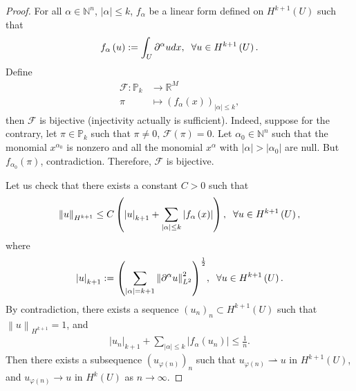 \documentclass[11pt,a4paper,center,notitlepage]{article}
\numberwithin{equation}{section}
\begin{document}
\begin{proof}
For all $\alpha \in \mathbb{N}^n$, $\left| \alpha  \right| \le k$, $f_\alpha$ be a linear form defined on $H^{k+1}\left(U\right)$ such that
\begin{align}
{f_\alpha }\left( u \right): = \int_U {{\partial ^\alpha }udx} , \hspace{2mm} \forall u \in {H^{k + 1}}\left( U \right).
\end{align}
Define 
\begin{align}
\mathcal{F}:{\mathbb{P}_k} &\to {\mathbb{R}^M}\\
\pi  &\mapsto {\left( {{f_\alpha }\left( x \right)} \right)_{\left| \alpha  \right| \le k}},
\end{align}
then $\mathcal{F}$ is bijective (injectivity actually is sufficient). Indeed, suppose for the contrary, let $\pi \in \mathbb{P}_k$ such that $\pi \ne 0$, $\mathcal{F}\left(\pi\right) =0$. Let $\alpha _0\in \mathbb{N}^n$ such that the monomial $x^{\alpha _0}$ is nonzero and all the monomial $x^\alpha$ with $\left| \alpha  \right| > \left| {{\alpha _0}} \right|$ are null. But $f_{\alpha _0} \left(\pi\right)$, contradiction. Therefore, $\mathcal{F}$ is bijective. 

Let us check that there exists a constant $C>0$ such that
\begin{align}
{\left\| u \right\|_{{H^{k + 1}}}} \le C\left( {{{\left| u \right|}_{k + 1}} + \sum\limits_{\left| \alpha  \right| \le k} {\left| {{f_\alpha }\left( x \right)} \right|} } \right),\hspace{2mm} \forall u \in {H^{k + 1}}\left( U \right),
\end{align}
where
\begin{align}
{\left| u \right|_{k + 1}}: = {\left( {\sum\limits_{\left| \alpha  \right| = k + 1} {\left\| {{\partial ^\alpha }u} \right\|_{{L^2}}^2} } \right)^{\frac{1}{2}}},\hspace{2mm} \forall u \in {H^{k + 1}}\left( U \right).
\end{align}
By contradiction, there exists a sequence ${\left( {{u_n}} \right)_n} \subset {H^{k + 1}}\left( U \right)$ such that ${\left\| u \right\|_{{H^{k + 1}}}} = 1$, and
\begin{align}
{\left| {{u_n}} \right|_{k + 1}} + \sum\limits_{\left| \alpha  \right| \le k} {\left| {{f_\alpha }\left( {{u_n}} \right)} \right|}  \le \frac{1}{n}.
\end{align}
Then there exists a subsequence ${\left( {{u_{\varphi \left( n \right)}}} \right)_n}$ such that $u_{\varphi \left(n\right)} \rightharpoonup u$ in $H^{k+1}\left(U\right)$, and $u_{\varphi \left(n\right)} \to u$ in $H^k\left(U\right)$ as $n\to \infty$. 


\end{proof}
\end{document}
